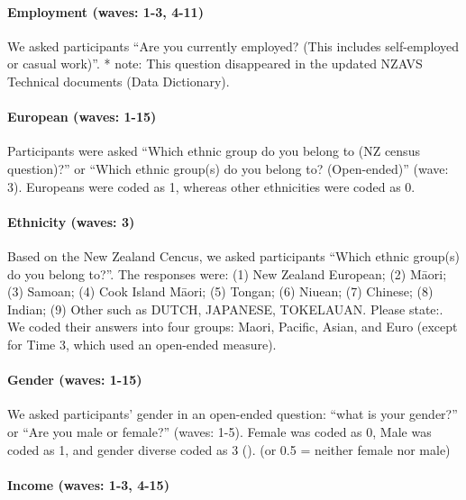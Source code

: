\documentclass[
  singlecolumn,
  9pt]{article}
\let\oldparagraph\paragraph
\renewcommand{\paragraph}[1]{\oldparagraph{#1}\mbox{}}
\begin{document}
\paragraph{Employment (waves: 1-3,
4-11)}\label{employment-waves-1-3-4-11}

We asked participants ``Are you currently employed? (This includes
self-employed or casual work)''. * note: This question disappeared in
the updated NZAVS Technical documents (Data Dictionary).

\paragraph{European (waves: 1-15)}\label{european-waves-1-15}

Participants were asked ``Which ethnic group do you belong to (NZ census
question)?'' or ``Which ethnic group(s) do you belong to? (Open-ended)''
(wave: 3). Europeans were coded as 1, whereas other ethnicities were
coded as 0.

\paragraph{Ethnicity (waves: 3)}\label{ethnicity-waves-3}

Based on the New Zealand Cencus, we asked participants ``Which ethnic
group(s) do you belong to?''. The responses were: (1) New Zealand
European; (2) Māori; (3) Samoan; (4) Cook Island Māori; (5) Tongan; (6)
Niuean; (7) Chinese; (8) Indian; (9) Other such as DUTCH, JAPANESE,
TOKELAUAN. Please state:. We coded their answers into four groups:
Maori, Pacific, Asian, and Euro (except for Time 3, which used an
open-ended measure).

\paragraph{Gender (waves: 1-15)}\label{gender-waves-1-15}

We asked participants' gender in an open-ended question: ``what is your
gender?'' or ``Are you male or female?'' (waves: 1-5). Female was coded
as 0, Male was coded as 1, and gender diverse coded as 3
(). (or 0.5
= neither female nor male)

\paragraph{Income (waves: 1-3, 4-15)}\label{income-waves-1-3-4-15}
\end{document}
